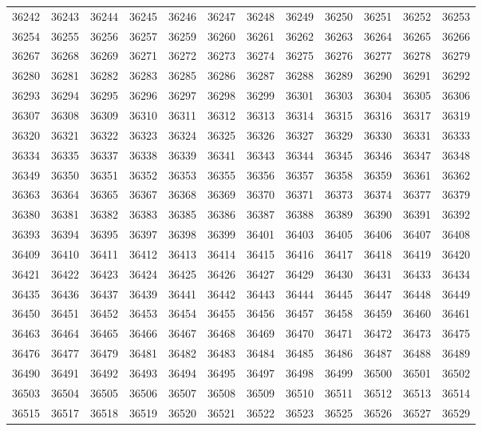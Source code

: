 \begin{center}
\begin{longtable}{llllllllllll}
36242 &36243 &36244 &36245 &36246 &36247 &36248 &36249 &36250 &36251 &36252 &36253 \\
36254 &36255 &36256 &36257 &36259 &36260 &36261 &36262 &36263 &36264 &36265 &36266 \\
36267 &36268 &36269 &36271 &36272 &36273 &36274 &36275 &36276 &36277 &36278 &36279 \\
36280 &36281 &36282 &36283 &36285 &36286 &36287 &36288 &36289 &36290 &36291 &36292 \\
36293 &36294 &36295 &36296 &36297 &36298 &36299 &36301 &36303 &36304 &36305 &36306 \\
36307 &36308 &36309 &36310 &36311 &36312 &36313 &36314 &36315 &36316 &36317 &36319 \\
36320 &36321 &36322 &36323 &36324 &36325 &36326 &36327 &36329 &36330 &36331 &36333 \\
36334 &36335 &36337 &36338 &36339 &36341 &36343 &36344 &36345 &36346 &36347 &36348 \\
36349 &36350 &36351 &36352 &36353 &36355 &36356 &36357 &36358 &36359 &36361 &36362 \\
36363 &36364 &36365 &36367 &36368 &36369 &36370 &36371 &36373 &36374 &36377 &36379 \\
36380 &36381 &36382 &36383 &36385 &36386 &36387 &36388 &36389 &36390 &36391 &36392 \\
36393 &36394 &36395 &36397 &36398 &36399 &36401 &36403 &36405 &36406 &36407 &36408 \\
36409 &36410 &36411 &36412 &36413 &36414 &36415 &36416 &36417 &36418 &36419 &36420 \\
36421 &36422 &36423 &36424 &36425 &36426 &36427 &36429 &36430 &36431 &36433 &36434 \\
36435 &36436 &36437 &36439 &36441 &36442 &36443 &36444 &36445 &36447 &36448 &36449 \\
36450 &36451 &36452 &36453 &36454 &36455 &36456 &36457 &36458 &36459 &36460 &36461 \\
36463 &36464 &36465 &36466 &36467 &36468 &36469 &36470 &36471 &36472 &36473 &36475 \\
36476 &36477 &36479 &36481 &36482 &36483 &36484 &36485 &36486 &36487 &36488 &36489 \\
36490 &36491 &36492 &36493 &36494 &36495 &36497 &36498 &36499 &36500 &36501 &36502 \\
36503 &36504 &36505 &36506 &36507 &36508 &36509 &36510 &36511 &36512 &36513 &36514 \\
36515 &36517 &36518 &36519 &36520 &36521 &36522 &36523 &36525 &36526 &36527 &36529 \\

\end{longtable}
\end{center}
